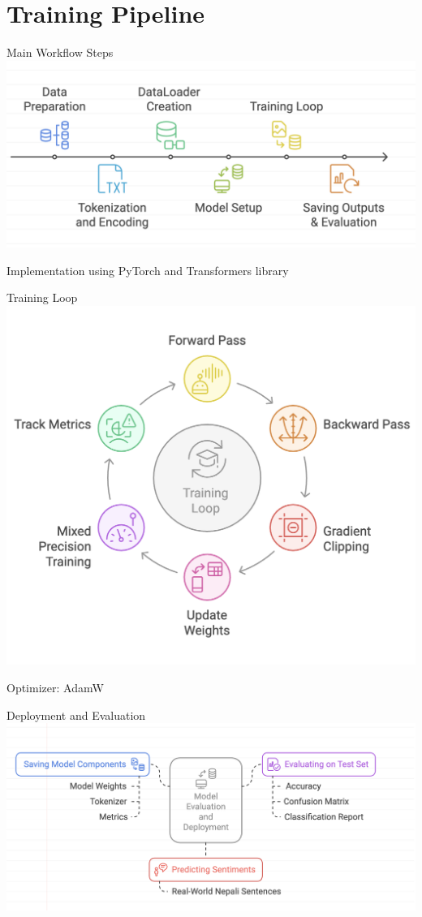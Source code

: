 \documentclass[aspectratio=169]{beamer}
\begin{document}
\section{Training Pipeline}
\begin{frame}{Main Workflow Steps}
  \centering
  \includegraphics[width=0.95\linewidth]{workflow.png}

\vspace{-0.5em}
\footnotesize{Implementation using PyTorch \parencite{paszke2019pytorchimperativestylehighperformance} and Transformers library \parencite{wolf-etal-2020-transformers}}
\end{frame}

\begin{frame}{Training Loop}
  \centering
  \includegraphics[width=0.55\linewidth]{trainLoop.png}

\footnotesize{Optimizer: AdamW \parencite{loshchilov2019decoupledweightdecayregularization}}
\end{frame}

\begin{frame}{Deployment and Evaluation}
  \centering
  \includegraphics[width=0.95\linewidth]{deployment.png}
\end{frame}
\end{document}
